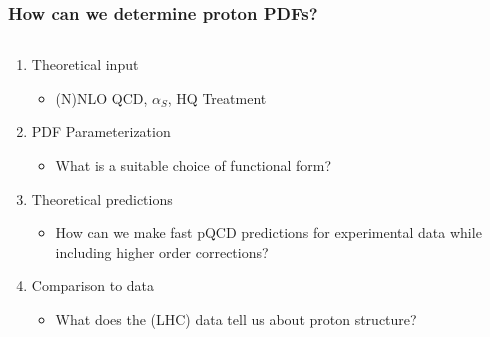 \documentclass[10pt]{beamer}
\begin{document}
\begin{frame}
\frametitle{How can we determine proton PDFs?}

\begin{columns}
\begin{column}{0.6\textwidth}
\begin{enumerate}
\item<1-> Theoretical input
\begin{itemize}
\item (N)NLO QCD, $\alpha_S$, HQ Treatment
\end{itemize}
\vskip15pt
\item<1-> PDF Parameterization
\begin{itemize}
\item What is a suitable choice of functional form?
\end{itemize}
\vskip15pt

\item<1-> Theoretical predictions
\begin{itemize}
\item How can we make fast pQCD predictions for experimental data while including higher order corrections?
\end{itemize}
\vskip15pt

\item<1-> Comparison to data
\begin{itemize}
\item What does the (LHC) data tell us about proton structure?
\end{itemize}
\end{enumerate}
\end{column}
\begin{column}{0.3\textwidth}

\end{column}
\end{columns}
\end{frame}
\end{document}
